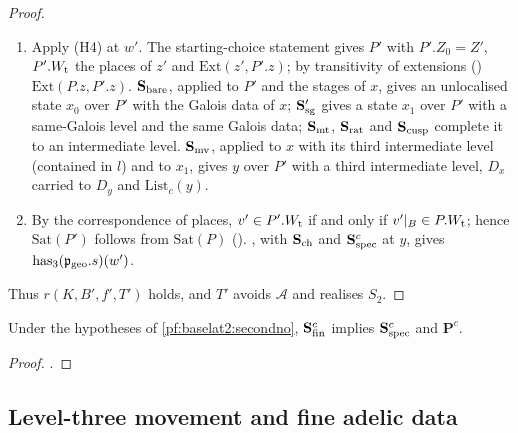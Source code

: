 \begin{proof}
\begin{enumerate}[label=(\arabic*)]
  support condition holds because $T'$ is twisted from $\sigma$ (so $\psi'_{v'}=1$ unless the restriction
  of $v'$ is twisted, hence in $P.\bltwoWt$). We get $Z'$ and $z'$ with $\mathrm{Ext}(P.z,z')$ and the
  correspondence of places. These data show that $w'$ is a starting witness: pinned, with good data
  ($\mathrm{good}$ is witnessed by $(Z',z')$), and coherent.
\item Apply (H4) at $w'$. The starting-choice statement gives $P'$ with $P'.Z_0=Z'$, $P'.W_{\mathrm{t}}$ the places of
  $z'$ and $\mathrm{Ext}(z',P'.z)$; by transitivity of extensions
  () $\mathrm{Ext}(P.z,P'.z)$. $\mathbf{S}_{\mathrm{bare}}$,
  applied to $P'$ and the stages of $x$, gives an unlocalised state $x_0$ over $P'$ with the Galois data of
  $x$; $\mathbf{S}_{\mathrm{sg}}'$ gives a
  state $x_1$ over $P'$ with a same-Galois level and the same Galois data; $\mathbf{S}_{\mathrm{mt}}$, $\mathbf{S}_{\mathrm{rat}}$ and
  $\mathbf{S}_{\mathrm{cusp}}$ complete it to an intermediate level. $\mathbf{S}_{\mathrm{mv}}$, applied to $x$ with its third
  intermediate level (contained in $l$) and to $x_1$, gives $y$ over $P'$ with a third intermediate level,
  $D_x$ carried to $D_y$ and $\mathrm{List}_c(y)$.
\item By the correspondence of places, $v'\in P'.W_{\mathrm{t}}$ if and only if $v'|_B\in P.W_{\mathrm{t}}$; hence
  $\mathrm{Sat}(P')$ follows from $\mathrm{Sat}(P)$ ().
  , with $\mathbf{S}_{\mathrm{ch}}$ and $\mathbf{S}_{\mathrm{spec}}^{c}$ at $y$, gives
  $\mathrm{has}_3(\mathfrak{p}_{\mathrm{geo}}.s)(w')$.
\end{enumerate}
Thus $r(K,B',f',T')$ holds, and $T'$ avoids $\mathcal A$ and realises $S_2$.
\end{proof}

\begin{theorem}\label{pf:baselat2:sfino}
Under the hypotheses of \cref{pf:baselat2:secondno}, $\mathbf{S}_{\mathrm{fin}}^{c}$ implies $\mathbf{S}_{\mathrm{spec}}^{c}$ and
$\mathbf{P}^{c}$.
\end{theorem}

\begin{proof}
.
\end{proof}

\subsection{Level-three movement and fine adelic data}\label{sec:pf:baselat2:lv3}

